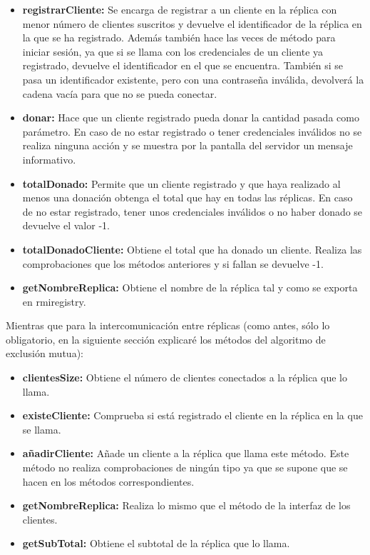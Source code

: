 \documentclass{article}
\begin{document}
\begin{itemize}
    \item \textbf{registrarCliente: }Se encarga de registrar a un cliente en la réplica con menor número de clientes suscritos y devuelve el identificador de la réplica en la que se ha registrado. Además también hace las veces de método para iniciar sesión, ya que si se llama con los credenciales de un cliente ya registrado, devuelve el identificador en el que se encuentra. También si se pasa un identificador existente, pero con una contraseña inválida, devolverá la cadena vacía para que no se pueda conectar.
    
    \item \textbf{donar: }Hace que un cliente registrado pueda donar la cantidad pasada como parámetro. En caso de no estar registrado o tener credenciales inválidos no se realiza ninguna acción y se muestra por la pantalla del servidor un mensaje informativo.

    \item \textbf{totalDonado: }Permite que un cliente registrado y que haya realizado al menos una donación obtenga el total que hay en todas las réplicas. En caso de no estar registrado, tener unos credenciales inválidos o no haber donado se devuelve el valor -1.
    
    \item \textbf{totalDonadoCliente: }Obtiene el total que ha donado un cliente. Realiza las comprobaciones que los métodos anteriores y si fallan se devuelve -1.\
    
    \item \textbf{getNombreReplica: }Obtiene el nombre de la réplica tal y como se exporta en rmiregistry.
\end{itemize}

Mientras que para la intercomunicación entre réplicas (como antes, sólo lo obligatorio, en la siguiente sección explicaré los métodos del algoritmo de exclusión mutua):

\begin{itemize}
    \item \textbf{clientesSize: }Obtiene el número de clientes conectados a la réplica que lo llama.
    \item \textbf{existeCliente: }Comprueba si está registrado el cliente en la réplica en la que se llama.
    \item \textbf{añadirCliente: }Añade un cliente a la réplica que llama este método. Este método no realiza comprobaciones de ningún tipo ya que se supone que se hacen en los métodos correspondientes.
    \item \textbf{getNombreReplica: }Realiza lo mismo que el método de la interfaz de los clientes.
    \item \textbf{getSubTotal: }Obtiene el subtotal de la réplica que lo llama.
\end{itemize}
\end{document}
